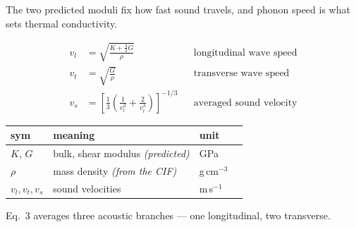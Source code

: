 \documentclass[aspectratio=169]{beamer}
\begin{document}
\begin{frame}

{\sffamily\scriptsize
The two predicted moduli fix how fast sound travels, and phonon speed is what
sets thermal conductivity.}

\vspace{3pt}
\begin{align}
v_l &= \sqrt{\frac{K + \tfrac{4}{3}G}{\rho}} &&\text{longitudinal wave speed} \\[2pt]
v_t &= \sqrt{\frac{G}{\rho}} &&\text{transverse wave speed} \\[2pt]
v_s &= \left[\frac{1}{3}\left(\frac{1}{v_l^{3}} + \frac{2}{v_t^{3}}\right)\right]^{-1/3}
   &&\text{averaged sound velocity}
\end{align}

\vspace{2pt}
\begin{center}
{\sffamily\scriptsize
\begin{tabular}{@{}llll@{}}
\toprule
sym & meaning & unit & \\
\midrule
$K$, $G$ & bulk, shear modulus \emph{(predicted)} & GPa & \\
$\rho$ & mass density \emph{(from the CIF)} & g\,cm$^{-3}$ & \\
$v_l, v_t, v_s$ & sound velocities & m\,s$^{-1}$ & \\
\bottomrule
\end{tabular}}
\end{center}

\vspace{1pt}
{\sffamily\scriptsize\color{Muted}
Eq.~3 averages three acoustic branches --- one longitudinal, two transverse.}
\end{frame}
\end{document}
